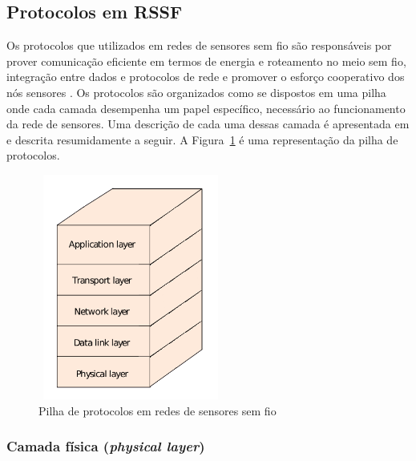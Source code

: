 \subsection{Protocolos em RSSF} 

Os protocolos que utilizados em redes de sensores sem fio são responsáveis por prover comunicação eficiente em termos de energia e roteamento no meio sem fio, integração entre dados e protocolos de rede e promover o esforço cooperativo dos nós sensores \cite{Akyildiz2002}. Os protocolos são organizados como se dispostos em uma pilha onde cada camada desempenha um papel específico, necessário ao funcionamento da rede de sensores. Uma descrição de cada uma dessas camada é apresentada em  \citeyear{Akyildiz2002} e descrita resumidamente a seguir. A Figura~\ref{fig:protocolStack} é uma representação da pilha de protocolos.

\begin{figure}[!htb]
\centering
\includegraphics[width=230px,height=280px]{./Pictures/ProtocolStack.png}
\caption{Pilha de protocolos em redes de sensores sem fio} %
\label{fig:protocolStack} %
\end{figure}


 \subsubsection{Camada física (\textit{physical layer})} 

